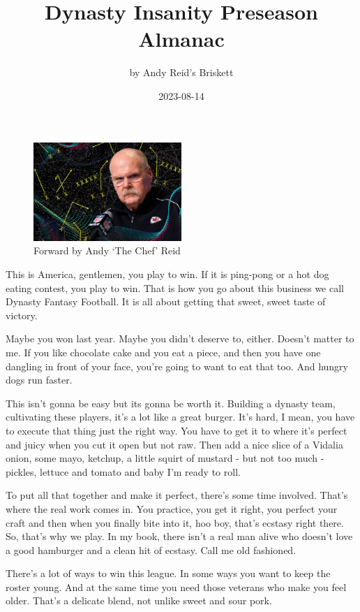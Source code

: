 \documentclass[
]{article}
\title{Dynasty Insanity Preseason Almanac}
\author{by Andy Reid's Briskett}
\date{2023-08-14}
\begin{document}
\maketitle

{
\setcounter{tocdepth}{4}
\tableofcontents
}
\newpage

\begin{figure}
\centering
\includegraphics[width=0.5\textwidth,height=\textheight]{img/andy.png}
\caption{Forward by Andy `The Chef' Reid}
\end{figure}

This is America, gentlemen, you play to win. If it is ping-pong or a hot
dog eating contest, you play to win. That is how you go about this
business we call Dynasty Fantasy Football. It is all about getting that
sweet, sweet taste of victory.

Maybe you won last year. Maybe you didn't deserve to, either. Doesn't
matter to me. If you like chocolate cake and you eat a piece, and then
you have one dangling in front of your face, you're going to want to eat
that too. And hungry dogs run faster.

This isn't gonna be easy but its gonna be worth it. Building a dynasty
team, cultivating these players, it's a lot like a great burger. It's
hard, I mean, you have to execute that thing just the right way. You
have to get it to where it's perfect and juicy when you cut it open but
not raw. Then add a nice slice of a Vidalia onion, some mayo, ketchup, a
little squirt of mustard - but not too much - pickles, lettuce and
tomato and baby I'm ready to roll.

To put all that together and make it perfect, there's some time
involved. That's where the real work comes in. You practice, you get it
right, you perfect your craft and then when you finally bite into it,
hoo boy, that's ecstasy right there. So, that's why we play. In my book,
there isn't a real man alive who doesn't love a good hamburger and a
clean hit of ecstasy. Call me old fashioned.

There's a lot of ways to win this league. In some ways you want to keep
the roster young. And at the same time you need those veterans who make
you feel older. That's a delicate blend, not unlike sweet and sour pork.
\end{document}
